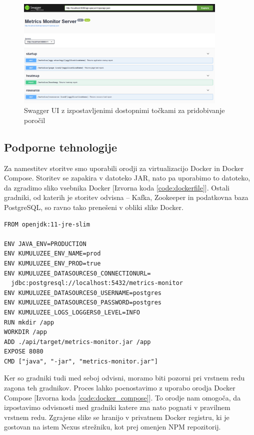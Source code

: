 \documentclass[a4paper, 12pt]{book}
\begin{document}
\begin{figure}[!htb]
	\begin{center}
		\includegraphics[width=0.9\textwidth]{swagger.png}
	\end{center}
	\caption{Swagger UI z izpostavljenimi dostopnimi točkami za pridobivanje poročil}
	\label{img:swagger}
\end{figure}

\subsection{Podporne tehnologije}
\label{ch3:sec2:sub3}

Za namestitev storitve smo uporabili orodji za virtualizacijo Docker in Docker Compose. Storitev se zapakira v datoteko JAR, nato pa uporabimo to datoteko, da zgradimo sliko vsebnika Docker [Izvorna koda \ref{code:dockerfile}]. Ostali gradniki, od katerih je storitev odvisna -- Kafka, Zookeeper in podatkovna baza PostgreSQL, so ravno tako prenešeni v obliki slike Docker.\newline

\begin{lstlisting}[label=code:dockerfile, caption=Dockerfile za storitev]
FROM openjdk:11-jre-slim

ENV JAVA_ENV=PRODUCTION
ENV KUMULUZEE_ENV_NAME=prod
ENV KUMULUZEE_ENV_PROD=true
ENV KUMULUZEE_DATASOURCES0_CONNECTIONURL=
  jdbc:postgresql://localhost:5432/metrics-monitor
ENV KUMULUZEE_DATASOURCES0_USERNAME=postgres
ENV KUMULUZEE_DATASOURCES0_PASSWORD=postgres
ENV KUMULUZEE_LOGS_LOGGERS0_LEVEL=INFO
RUN mkdir /app
WORKDIR /app
ADD ./api/target/metrics-monitor.jar /app
EXPOSE 8080
CMD ["java", "-jar", "metrics-monitor.jar"]
\end{lstlisting} 

Ker so gradniki tudi med seboj odvisni, moramo biti pozorni pri vrstnem redu zagona teh gradnikov. Proces lahko poenostavimo z uporabo orodja Docker Compose [Izvorna koda \ref{code:docker_compose}]. To orodje nam omogoča, da izpostavimo odvisnosti med gradniki katere zna nato pognati v pravilnem vrstnem redu. Zgrajene slike se hranijo v privatnem Docker registru, ki je gostovan na istem Nexus strežniku, kot prej omenjen NPM repozitorij.
\end{document}
